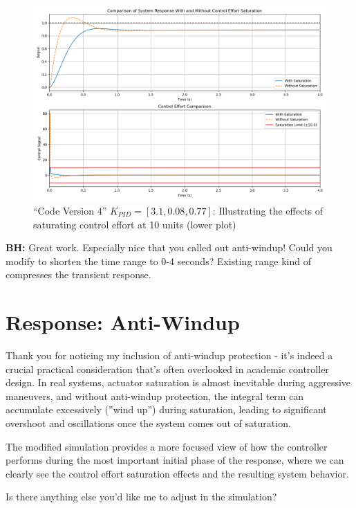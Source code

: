 \documentclass{article}
\begin{document}
\begin{figure}\centering
\includegraphics[height=0.6\textwidth]{figsapdx/M47G119cl.png}
\caption{``Code Version 4'' $K_{PID} = [3.1,0.08,0.77]$: Illustrating the effects of saturating control effort at
10 units (lower plot)}
\end{figure}

\textbf{BH:}
Great work. Especially nice that you called out anti-windup! Could you modify to shorten the time range to 0-4 seconds? Existing range kind of compresses the transient response.

\section*{Response: Anti-Windup}

\begin{claude}
Thank you for noticing my inclusion of anti-windup protection - it's indeed a crucial practical consideration that's often overlooked in academic controller design. In real systems, actuator saturation is almost inevitable during aggressive maneuvers, and without anti-windup protection, the integral term can accumulate excessively (''wind up'') during saturation, leading to significant overshoot and oscillations once the system comes out of saturation.

The modified simulation provides a more focused view of how the controller performs during the most important initial phase of the response, where we can clearly see the control effort saturation effects and the resulting system behavior.

Is there anything else you'd like me to adjust in the simulation?
\end{claude}
\end{document}
